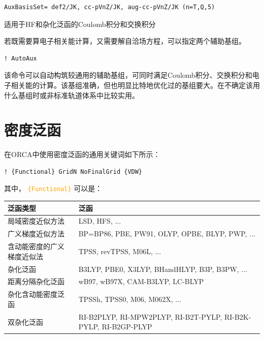 \documentclass{ctexart}
\newcommand{\cmd}[1]{\textcolor{orange}{ \texttt{#1} }}
\begin{document}
	\begin{lstlisting}
AuxBasisSet= def2/JK, cc-pVnZ/JK, aug-cc-pVnZ/JK (n=T,Q,5)
	\end{lstlisting}
	适用于HF和杂化泛函的Coulomb积分和交换积分
	
	若既需要算电子相关能计算，又需要解自洽场方程，可以指定两个辅助基组。
	
	\begin{lstlisting}
! AutoAux
	\end{lstlisting}
	
	该命令可以自动构筑较通用的辅助基组，可同时满足Coulomb积分、交换积分和电子相关能的计算。该基组准确，但也明显比特地优化过的基组要大。在不确定该用什么基组时或非标准轨道体系中比较实用。
	
	\section{密度泛函}
	
	在ORCA中使用密度泛函的通用关键词如下所示：
	\begin{lstlisting}
! {Functional} GridN NoFinalGrid {VDW}
	\end{lstlisting}
	其中，\cmd{\{Functional\}}可以是：
	\begin{table}[H]
		\centering
		\begin{tabularx}{0.9\linewidth}{lX}
			\toprule
			\textbf{泛函类型}          & \textbf{泛函}                                                             \\
			\midrule
			局域密度近似方法      & LSD, HFS, ...                                                    \\
			广义梯度近似方法      & BP=BP86, PBE, PW91, OLYP, OPBE, BLYP, PWP, ...                   \\
			含动能密度的广义梯度近似法 & TPSS, revTPSS, M06L, ...                                         \\
			杂化泛函          & B3LYP, PBE0, X3LYP, BHandHLYP, B3P, B3PW, ...                    \\
			距离分隔杂化泛函      & wB97, wB97X, CAM-B3LYP, LC-BLYP                                \\
			杂化含动能密度泛函     & TPSSh, TPSS0, M06, M062X, ...                                  \\
			双杂化泛函         & RI-B2PLYP, RI-MPW2PLYP, RI-B2T-PYLP, RI-B2K-PYLP, RI-B2GP-PLYP\\
			\bottomrule
		\end{tabularx}
	\end{table}
	
\end{document}
